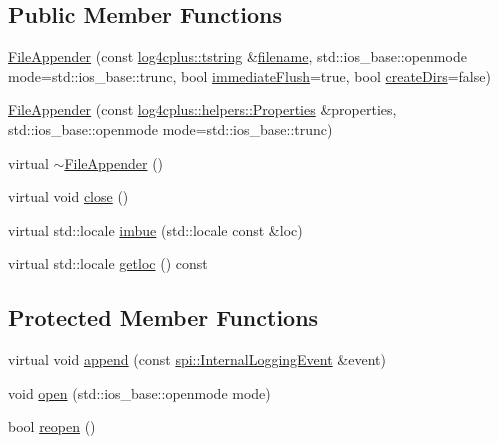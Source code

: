 \subsection*{Public Member Functions}
\begin{DoxyCompactItemize}
\item 
\hyperlink{classlog4cplus_1_1FileAppender_a34a56fce967c5745257a29895dfe1b57}{File\-Appender} (const \hyperlink{namespacelog4cplus_a3c9287f6ebcddc50355e29d71152117b}{log4cplus\-::tstring} \&\hyperlink{classlog4cplus_1_1FileAppender_aa04b4a30301c69d784248eccbac2f864}{filename}, std\-::ios\-\_\-base\-::openmode mode=std\-::ios\-\_\-base\-::trunc, bool \hyperlink{classlog4cplus_1_1FileAppender_a89f7c6ae8f630cc2190a376fcc7ca2cc}{immediate\-Flush}=true, bool \hyperlink{classlog4cplus_1_1FileAppender_aa9b466ab8de95868505db1b05c645e3f}{create\-Dirs}=false)
\item 
\hyperlink{classlog4cplus_1_1FileAppender_ad8419f6c44e79e297ad67c5aa13a153b}{File\-Appender} (const \hyperlink{classlog4cplus_1_1helpers_1_1Properties}{log4cplus\-::helpers\-::\-Properties} \&properties, std\-::ios\-\_\-base\-::openmode mode=std\-::ios\-\_\-base\-::trunc)
\item 
virtual \hyperlink{classlog4cplus_1_1FileAppender_a06c5ec5269b11cb8c51b8abf7a3c2be4}{$\sim$\-File\-Appender} ()
\item 
virtual void \hyperlink{classlog4cplus_1_1FileAppender_ab6eae1f13e1eae0db2f801e52c150e41}{close} ()
\item 
virtual std\-::locale \hyperlink{classlog4cplus_1_1FileAppender_a0bd339348a4808928002fe687d20c7d9}{imbue} (std\-::locale const \&loc)
\item 
virtual std\-::locale \hyperlink{classlog4cplus_1_1FileAppender_a847fb3110d62f11e04c890c904e7c4bd}{getloc} () const 
\end{DoxyCompactItemize}
\subsection*{Protected Member Functions}
\begin{DoxyCompactItemize}
\item 
virtual void \hyperlink{classlog4cplus_1_1FileAppender_a47a8d23755accaf61487844f6361958f}{append} (const \hyperlink{classlog4cplus_1_1spi_1_1InternalLoggingEvent}{spi\-::\-Internal\-Logging\-Event} \&event)
\item 
void \hyperlink{classlog4cplus_1_1FileAppender_abbb4bac90d278e50d87bec6628d4b8cc}{open} (std\-::ios\-\_\-base\-::openmode mode)
\item 
bool \hyperlink{classlog4cplus_1_1FileAppender_ae88bfd1b1e50df4d26479820f71726ac}{reopen} ()
\end{DoxyCompactItemize}

